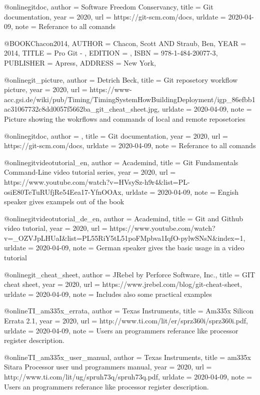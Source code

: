 



@online{gitdoc,
author = {Software Freedom Conservancy},
title = {Git documentation},
year = 2020,
url = {https://git-scm.com/docs},
urldate = {2020-04-09},
note = {Referance to all comands}
}



@BOOK{Chacon2014,
	AUTHOR = {Chacon, Scott AND Straub, Ben},
	YEAR = {2014},
	TITLE = {Pro Git - },
	EDITION = {},
	ISBN = {978-1-484-20077-3},
	PUBLISHER = {Apress},
	ADDRESS = {New York},
}

@online{git_picture,
author = {Detrich Beck},
title = {Git reposetory workflow picture},
year = 2020,
url =
{https://www-acc.gsi.de/wiki/pub/Timing/TimingSystemHowBuildingDeployment/igp_86efbb1ac31067732c8dd0057f5662ba_git_cheat_sheet.jpg},
urldate = {2020-04-09},
note = {Picture showing the wokrflows and commands of local and remote
    reposetories}
}

@online{gitdoc,
author = {},
title = {Git documentation},
year = 2020,
url = {https://git-scm.com/docs},
urldate = {2020-04-09},
note = {Referance to all comands}
}

@online{gitvideotutorial_en,
author = {Academind},
title = {Git Fundamentals Command-Line video tutorial series},
year = 2020,
url = {https://www.youtube.com/watch?v=HVsySz-h9r4&list=PL-osiE80TeTuRUfjRe54Eea17-YfnOOAx},
urldate = {2020-04-09},
note = {Engish speaker gives exampels out of the book \cite{Chacon2014}}
}


@online{gitvideotutorial_de_en,
author = {Academind},
title = {Git and Github video tutorial},
year = 2020,
url = {https://www.youtube.com/watch?v=_OZVJpLHUaI&list=PL55RiY5tL51poFMpbva1IqfO-pylwSNsN&index=1},
urldate = {2020-04-09},
note = {German speaker gives the basic usage in a video tutorial}
}


@online{git_cheat_sheet,
author = {JRebel by Perforce Software, Inc.},
title = {GIT cheat sheet},
year = 2020,
url = {https://www.jrebel.com/blog/git-cheat-sheet},
urldate = {2020-04-09},
note = {Includes also some practical examples}
}


@online{TI_am335x_errata,
author = {Texas Instruments},
title = {Am335x Silicon Errata 2.1},
year = 2020,
url = {http://www.ti.com/lit/er/sprz360i/sprz360i.pdf},
urldate = {2020-04-09},
note = {Users an programmers referance like processor register description.}
}

@online{TI_am335x_user_manual,
author = {Texas Instruments},
title = {am335x Sitara Processor user und programmers manual},
year = 2020,
url = {http://www.ti.com/lit/ug/spruh73q/spruh73q.pdf},
urldate = {2020-04-09},
note = {Users an programmers referance like processor register description.}
}


